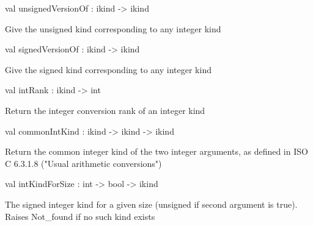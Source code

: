 \documentclass[11pt]{article}
\begin{document}
\label{val:Cil.unsignedVersionOf}\begin{ocamldoccode}
val unsignedVersionOf : ikind -> ikind
\end{ocamldoccode}
\begin{ocamldocdescription}
Give the unsigned kind corresponding to any integer kind


\end{ocamldocdescription}




\label{val:Cil.signedVersionOf}\begin{ocamldoccode}
val signedVersionOf : ikind -> ikind
\end{ocamldoccode}
\begin{ocamldocdescription}
Give the signed kind corresponding to any integer kind


\end{ocamldocdescription}




\label{val:Cil.intRank}\begin{ocamldoccode}
val intRank : ikind -> int
\end{ocamldoccode}
\begin{ocamldocdescription}
Return the integer conversion rank of an integer kind


\end{ocamldocdescription}




\label{val:Cil.commonIntKind}\begin{ocamldoccode}
val commonIntKind : ikind -> ikind -> ikind
\end{ocamldoccode}
\begin{ocamldocdescription}
Return the common integer kind of the two integer arguments, as
    defined in ISO C 6.3.1.8 ("Usual arithmetic conversions")


\end{ocamldocdescription}




\label{val:Cil.intKindForSize}\begin{ocamldoccode}
val intKindForSize : int -> bool -> ikind
\end{ocamldoccode}
\begin{ocamldocdescription}
The signed integer kind for a given size (unsigned if second argument
 is true). Raises Not\_found if no such kind exists


\end{ocamldocdescription}
\end{document}
